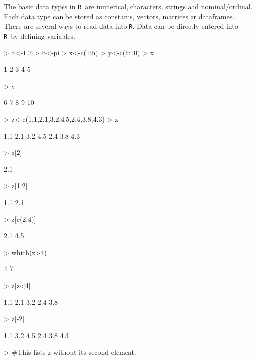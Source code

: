 \documentclass[12pt,A4,makeidx]{article}
\newcommand{\tR}{\texttt{R}}
\begin{document}
The basic data types in \tR \ are numerical, characters, strings and nominal/ordinal. Each data type can be stored 
as constants, vectors, matrices or dataframes.
There are several ways to read data into \tR.
Data can be directly entered into \tR\ by defining variables.
\begin{Schunk}
\begin{Sinput}
> a<-1.2
> b<-pi
> x<-c(1:5)
> y<-c(6:10)
> x
\end{Sinput}
\begin{Soutput}
[1] 1 2 3 4 5
\end{Soutput}
\begin{Sinput}
> y
\end{Sinput}
\begin{Soutput}
[1]  6  7  8  9 10
\end{Soutput}
\begin{Sinput}
> z<-c(1.1,2.1,3.2,4.5,2.4,3.8,4.3)
> z
\end{Sinput}
\begin{Soutput}
[1] 1.1 2.1 3.2 4.5 2.4 3.8 4.3
\end{Soutput}
\begin{Sinput}
> z[2]
\end{Sinput}
\begin{Soutput}
[1] 2.1
\end{Soutput}
\begin{Sinput}
> z[1:2]
\end{Sinput}
\begin{Soutput}
[1] 1.1 2.1
\end{Soutput}
\begin{Sinput}
> z[c(2,4)]
\end{Sinput}
\begin{Soutput}
[1] 2.1 4.5
\end{Soutput}
\begin{Sinput}
> which(z>4)
\end{Sinput}
\begin{Soutput}
[1] 4 7
\end{Soutput}
\begin{Sinput}
> z[z<4]
\end{Sinput}
\begin{Soutput}
[1] 1.1 2.1 3.2 2.4 3.8
\end{Soutput}
\begin{Sinput}
> z[-2]
\end{Sinput}
\begin{Soutput}
[1] 1.1 3.2 4.5 2.4 3.8 4.3
\end{Soutput}
\begin{Sinput}
> #This lists z without its second element.
\end{Sinput}
\end{Schunk}
\end{document}
